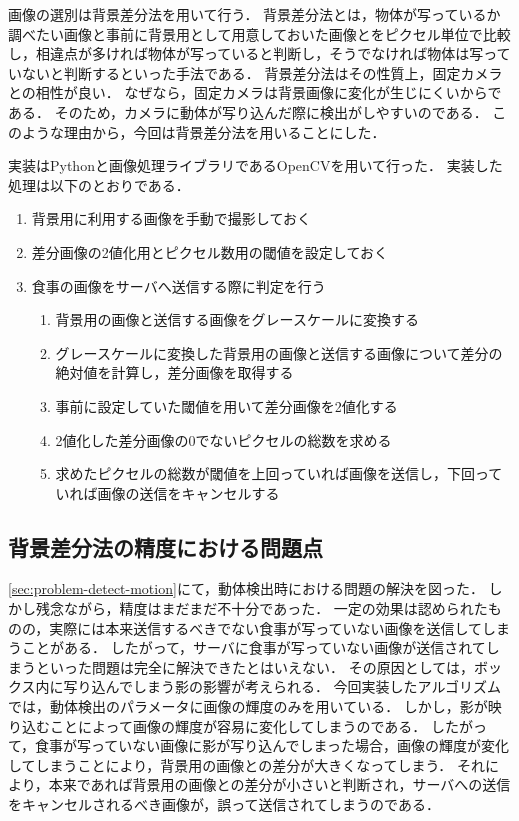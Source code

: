 \documentclass[../report]{subfiles}
\begin{document}
画像の選別は背景差分法を用いて行う．
背景差分法とは，物体が写っているか調べたい画像と事前に背景用として用意しておいた画像とをピクセル単位で比較し，相違点が多ければ物体が写っていると判断し，そうでなければ物体は写っていないと判断するといった手法である．
背景差分法はその性質上，固定カメラとの相性が良い．
なぜなら，固定カメラは背景画像に変化が生じにくいからである．
そのため，カメラに動体が写り込んだ際に検出がしやすいのである．
このような理由から，今回は背景差分法を用いることにした．

実装はPythonと画像処理ライブラリであるOpenCVを用いて行った．
実装した処理は以下のとおりである．
\begin{enumerate}
    \item 背景用に利用する画像を手動で撮影しておく
    \item 差分画像の2値化用とピクセル数用の閾値を設定しておく
    \item 食事の画像をサーバへ送信する際に判定を行う
    \begin{enumerate}
        \item 背景用の画像と送信する画像をグレースケールに変換する
        \item グレースケールに変換した背景用の画像と送信する画像について差分の絶対値を計算し，差分画像を取得する
        \item 事前に設定していた閾値を用いて差分画像を2値化する
        \item 2値化した差分画像の0でないピクセルの総数を求める
        \item 求めたピクセルの総数が閾値を上回っていれば画像を送信し，下回っていれば画像の送信をキャンセルする
    \end{enumerate}
\end{enumerate}

\subsection{背景差分法の精度における問題点}
\ref{sec:problem-detect-motion}にて，動体検出時における問題の解決を図った．
しかし残念ながら，精度はまだまだ不十分であった．
一定の効果は認められたものの，実際には本来送信するべきでない食事が写っていない画像を送信してしまうことがある．
したがって，サーバに食事が写っていない画像が送信されてしまうといった問題は完全に解決できたとはいえない．
その原因としては，ボックス内に写り込んでしまう影の影響が考えられる．
今回実装したアルゴリズムでは，動体検出のパラメータに画像の輝度のみを用いている．
しかし，影が映り込むことによって画像の輝度が容易に変化してしまうのである．
したがって，食事が写っていない画像に影が写り込んでしまった場合，画像の輝度が変化してしまうことにより，背景用の画像との差分が大きくなってしまう．
それにより，本来であれば背景用の画像との差分が小さいと判断され，サーバへの送信をキャンセルされるべき画像が，誤って送信されてしまうのである．
\end{document}
